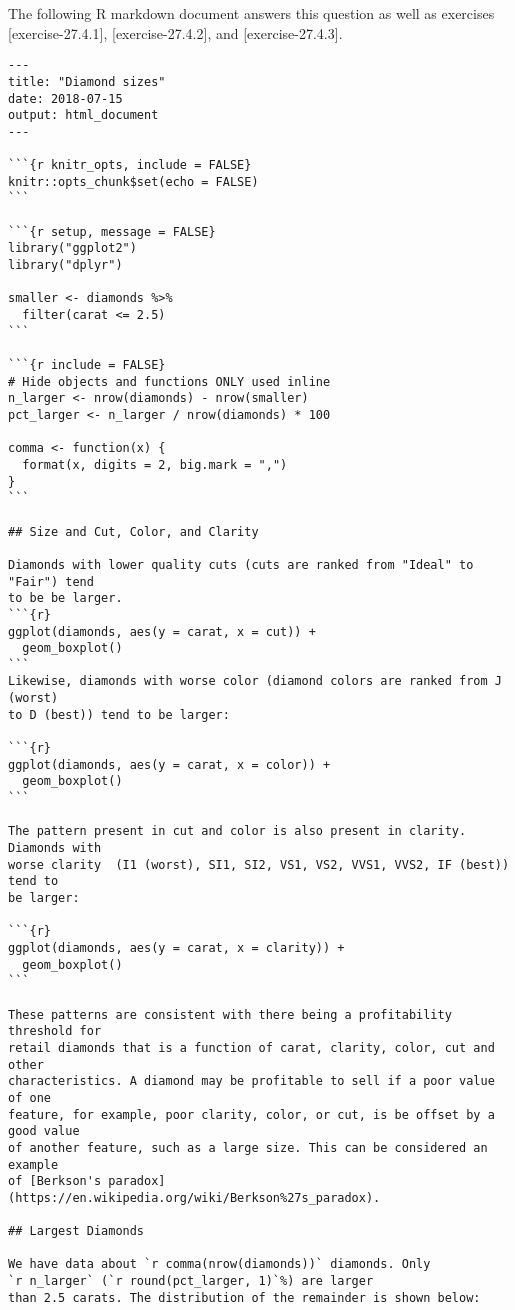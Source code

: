\documentclass[]{book}
\theoremstyle{plain}
\theoremstyle{remark}
\begin{document}
The following R markdown document answers this question as well as
exercises {[}exercise-27.4.1{]}, {[}exercise-27.4.2{]}, and
{[}exercise-27.4.3{]}.

\begin{verbatim}
---
title: "Diamond sizes"
date: 2018-07-15
output: html_document
---

```{r knitr_opts, include = FALSE}
knitr::opts_chunk$set(echo = FALSE)
```

```{r setup, message = FALSE}
library("ggplot2")
library("dplyr")

smaller <- diamonds %>%
  filter(carat <= 2.5)
```

```{r include = FALSE}
# Hide objects and functions ONLY used inline
n_larger <- nrow(diamonds) - nrow(smaller)
pct_larger <- n_larger / nrow(diamonds) * 100

comma <- function(x) {
  format(x, digits = 2, big.mark = ",")
}
```

## Size and Cut, Color, and Clarity

Diamonds with lower quality cuts (cuts are ranked from "Ideal" to "Fair") tend 
to be be larger.
```{r}
ggplot(diamonds, aes(y = carat, x = cut)) +
  geom_boxplot()
```
Likewise, diamonds with worse color (diamond colors are ranked from J (worst)
to D (best)) tend to be larger:

```{r}
ggplot(diamonds, aes(y = carat, x = color)) +
  geom_boxplot()
```

The pattern present in cut and color is also present in clarity. Diamonds with 
worse clarity  (I1 (worst), SI1, SI2, VS1, VS2, VVS1, VVS2, IF (best)) tend to
be larger:

```{r}
ggplot(diamonds, aes(y = carat, x = clarity)) +
  geom_boxplot()
```

These patterns are consistent with there being a profitability threshold for 
retail diamonds that is a function of carat, clarity, color, cut and other 
characteristics. A diamond may be profitable to sell if a poor value of one
feature, for example, poor clarity, color, or cut, is be offset by a good value
of another feature, such as a large size. This can be considered an example
of [Berkson's paradox](https://en.wikipedia.org/wiki/Berkson%27s_paradox).

## Largest Diamonds

We have data about `r comma(nrow(diamonds))` diamonds. Only
`r n_larger` (`r round(pct_larger, 1)`%) are larger
than 2.5 carats. The distribution of the remainder is shown below:


\end{verbatim}
\end{document}
